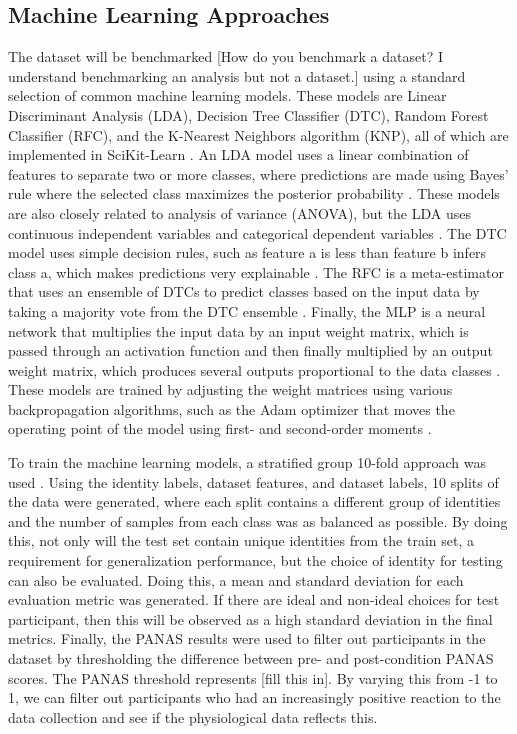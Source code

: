 \documentclass[12pt]{iopart}
\begin{document}
\subsection*{Machine Learning Approaches}

The dataset will be benchmarked [How do you benchmark a dataset? I understand benchmarking an analysis but not a dataset.] using a standard selection of common machine learning models.  These models are Linear Discriminant Analysis (LDA), Decision Tree Classifier (DTC), Random Forest Classifier (RFC), and the K-Nearest Neighbors algorithm (KNP), all of which are implemented in SciKit-Learn \cite{pedregosa2011scikit}.  An LDA model uses a linear combination of features to separate two or more classes, where predictions are made using Bayes’ rule where the selected class maximizes the posterior probability \cite{hastie2009elements}.  These models are also closely related to analysis of variance (ANOVA), but the LDA uses continuous independent variables and categorical dependent variables \cite{wetcher2011analyzing}.  The DTC model uses simple decision rules, such as feature a is less than feature b infers class a, which makes predictions very explainable \cite{breiman1984nonlinear}.  The RFC is a meta-estimator that uses an ensemble of DTCs to predict classes based on the input data by taking a majority vote from the DTC ensemble \cite{breiman1999random}.  Finally, the MLP is a neural network that multiplies the input data by an input weight matrix, which is passed through an activation function and then finally multiplied by an output weight matrix, which produces several outputs proportional to the data classes \cite{hinton1990connectionist}.  These models are trained by adjusting the weight matrices using various backpropagation algorithms, such as the Adam optimizer that moves the operating point of the model using first- and second-order moments \cite{kingma2014adam}.

To train the machine learning models, a stratified group 10-fold approach was used \cite{pedregosa2011scikit}.  Using the identity labels, dataset features, and dataset labels, 10 splits of the data were generated, where each split contains a different group of identities and the number of samples from each class was as balanced as possible.  By doing this, not only will the test set contain unique identities from the train set, a requirement for generalization performance, but the choice of identity for testing can also be evaluated.  Doing this, a mean and standard deviation for each evaluation metric was generated.  If there are ideal and non-ideal choices for test participant, then this will be observed as a high standard deviation in the final metrics.  Finally, the PANAS results were used to filter out participants in the dataset by thresholding the difference between pre- and post-condition PANAS scores. The PANAS threshold represents [fill this in]. By varying this from -1 to 1, we can filter out participants who had an increasingly positive reaction to the data collection and see if the physiological data reflects this.
\end{document}
